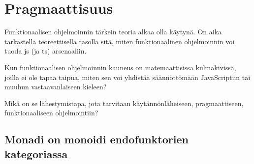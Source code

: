 














\section{Pragmaattisuus}

Funktionaalisen ohjelmoinnin tärkein teoria alkaa olla käytynä. On aika tarkastella teoreettisella tasolla sitä, miten funktionaalinen ohjelmoinnin voi tuoda \gls{js} (ja \gls{ts}) arsenaaliin.

Kun funktionaalisen ohjelmoinnin kauneus on matemaattisissa kulmakivissä, joilla ei ole tapaa taipua, miten sen voi yhdistää säännöttömään JavaScriptiin tai muuhun vastaavanlaiseen kieleen?

Mikä on se lähestymistapa, jota tarvitaan käytännönläheiseen, pragmaattiseen, funktionaaliseen ohjelmointiin?

\subsection{Monadi on monoidi endofunktorien kategoriassa}


